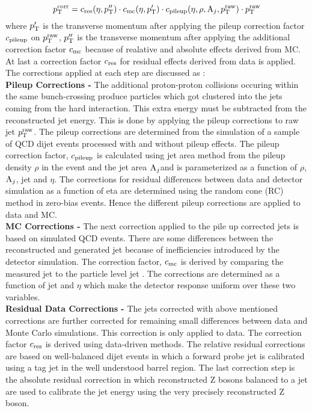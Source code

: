 \begin{equation}
p^{\rm corr}_{\rm T} = c_{\rm res}(\eta,p''_{\rm T})\cdot c_{\rm mc}(\eta,p'_{\rm T})\cdot c_{\rm pileup}(\eta,\rho,{\rm A}_{j},p^{\rm raw}_{\rm T})\cdot p^{\rm raw}_{\rm T}
\end{equation}
where $p'_{\rm T}$ is the transverse momentum after applying the pileup correction factor $c_{\rm pileup}$ on $p^{\rm raw}_{\rm T}$, $p''_{\rm T}$ is the transverse momentum after applying the additional correction factor $c_{\rm mc}$ because of realative and absolute effects derived from MC. At last a correction factor $c_{\rm res}$ for residual effects derived from data is applied. The corrections applied at each step are discussed as : \\\newline
{\bf Pileup Corrections -} The additional proton-proton collisions occuring within the same bunch-crossing produce particles which got clustered into the jets coming from the hard interaction. This extra energy must be subtracted from the reconstructed jet energy. This is done by applying the pileup corrections to raw jet $p^{\rm raw}_{\rm T}$. The pileup corrections are determined from the simulation of a sample of QCD dijet events processed with and without pileup effects. The pileup correction factor, $c_{\rm pileup}$ is calculated using jet area method from the pileup density $\rho$ in the event and the jet area ${\rm A}_{j}$and is parameterized as a function of $\rho$, ${\rm A}_{j}$, jet \pt and $\eta$. The corrections for residual differences between data and detector simulation as a function of eta are determined using the random cone (RC) method in zero-bias events. Hence the different pileup corrections are applied to data and MC. \\ \newline
{\bf MC Corrections -} The next correction applied to the pile up corrected jets is based on simulated QCD events. There are some differences between the reconstructed and generated jet \pt because of inefficiencies introduced by the detector simulation. The correction factor, $c_{\rm mc}$ is derived by comparing the measured jet \pt to the particle level jet \pt. The corrections are determined as a function of jet \pt and $\eta$ which make the detector response uniform over these two variables. \\ \newline
{\bf Residual Data Corrections -} The jets corrected with above mentioned corrections are further corrected for remaining small differences between data and Monte Carlo simulations. This correction is only applied to data. The correction factor $c_{\rm res}$ is derived using data-driven methods. The relative residual corrections are based on well-balanced dijet events in which a forward probe jet is calibrated using a tag jet in the well understood barrel region. The last correction step is the absolute residual correction in which reconstructed Z bosons balanced to a jet are used to calibrate the jet energy using the very precisely reconstructed Z boson. \\ \newline
